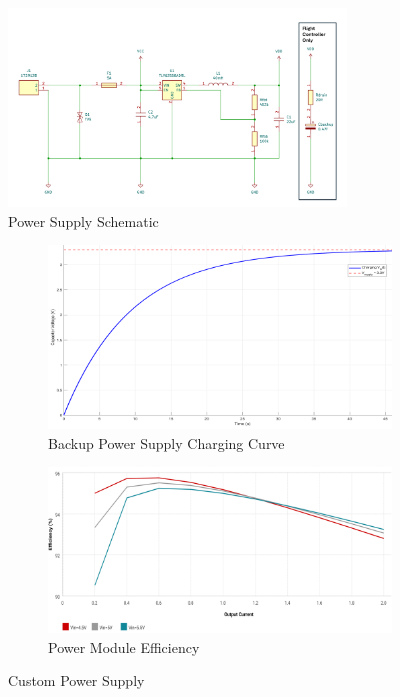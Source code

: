 \begin{figure}[htbp]
  \centering
  \includegraphics[width=0.8\textwidth]{figs/Thomas/Custom Hardware/Power Supply.png}
  \caption{Power Supply Schematic}
  \label{fig:power_supply_schematic}
\end{figure}

\begin{figure}[htbp]
  \centering
  \begin{subfigure}[b]{0.6\textwidth}
    \includegraphics[width=\textwidth]{figs/Thomas/Custom Hardware/charging_curve.png}
    \caption{Backup Power Supply Charging Curve}
    \label{fig:charging_curve}
  \end{subfigure}
  \hfill
  \begin{subfigure}[b]{0.6\textwidth}
    \includegraphics[width=\textwidth]{figs/Thomas/Custom Hardware/Power Module Effciency.png}
    \caption{Power Module Efficiency}
    \label{fig:power_efficiency}
  \end{subfigure}
  \caption{Custom Power Supply}
  \label{fig:power_graphs}
\end{figure}

